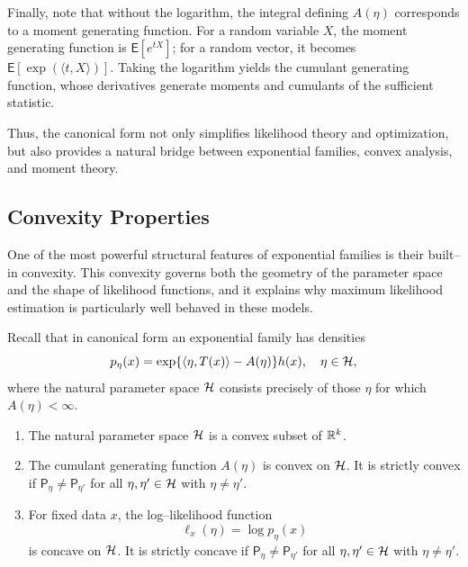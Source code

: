 Finally, note that without the logarithm, the integral defining \(A(\eta)\) corresponds to
a moment generating function.
For a random variable \(X\), the moment generating function is
\(\mathsf{E}[e^{tX}]\);
for a random vector, it becomes
\(\mathsf{E}[\exp(\langle t, X \rangle)]\).
Taking the logarithm yields the cumulant generating function, whose derivatives generate
moments and cumulants of the sufficient statistic.

Thus, the canonical form not only simplifies likelihood theory and optimization, but also
provides a natural bridge between exponential families, convex analysis, and moment theory.

\subsection{Convexity Properties}
\label{sub:Convexity Properties}

One of the most powerful structural features of exponential families is their built--in
convexity. This convexity governs both the geometry of the parameter space and the shape of
likelihood functions, and it explains why maximum likelihood estimation is particularly
well behaved in these models.

Recall that in canonical form an exponential family has densities
\[
    p_{\eta}(x)
    =
    \exp\{\langle \eta, T(x) \rangle - A(\eta)\} h(x),
    \quad \eta \in \mathcal{H},
\]
where the natural parameter space \(\mathcal{H}\) consists precisely of those \(\eta\) for which
\(A(\eta) < \infty\).

\begin{theo}
\label{theo:Convexity}
\leavevmode
\begin{enumerate}[label=(\roman*)]
    \item The natural parameter space \(\mathcal{H}\) is a convex subset of \(\mathbb{R}^k\).
    \item The cumulant generating function \(A(\eta)\) is convex on \(\mathcal{H}\).
        \label{ite:2}
    It is strictly convex if
    \(\mathsf{P}_{\eta} \neq \mathsf{P}_{\eta'}\) for all
    \(\eta,\eta' \in \mathcal{H}\) with \(\eta \neq \eta'\).
    \item For fixed data \(x\), the log--likelihood function
        \label{ite:3}
    \[
        \ell_x(\eta) = \log p_{\eta}(x)
    \]
    is concave on \(\mathcal{H}\).
    It is strictly concave if
    \(\mathsf{P}_{\eta} \neq \mathsf{P}_{\eta'}\) for all
    \(\eta,\eta' \in \mathcal{H}\) with \(\eta \neq \eta'\).
\end{enumerate}
\end{theo}

